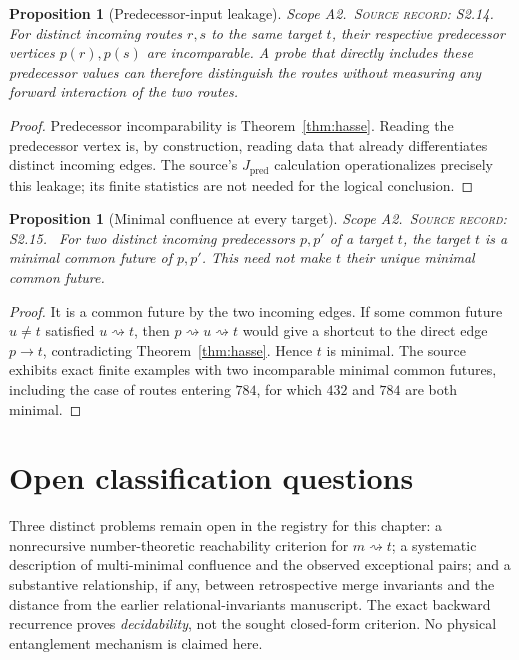 \documentclass[11pt,oneside,openany]{book}
\newtheorem{proposition}[theorem]{Proposition}
\theoremstyle{definition}
\theoremstyle{remark}
\newcommand{\scope}[1]{\textsf{\small Scope #1.}\ }
\newcommand{\record}[1]{\textup{\textsc{Source record: #1.}}\ }
\begin{document}
\begin{proposition}[Predecessor-input leakage]\label{prop:leak}
\scope{A2}\record{S2.14} For distinct incoming routes \(r,s\) to the same target \(t\), their respective predecessor vertices \(p(r),p(s)\) are incomparable. A probe that directly includes these predecessor values can therefore distinguish the routes without measuring any forward interaction of the two routes.
\end{proposition}
\begin{proof}
Predecessor incomparability is Theorem~\ref{thm:hasse}. Reading the predecessor vertex is, by construction, reading data that already differentiates distinct incoming edges. The source's \(J_{\mathrm{pred}}\) calculation operationalizes precisely this leakage; its finite statistics are not needed for the logical conclusion.
\end{proof}

\begin{proposition}[Minimal confluence at every target]\label{prop:confluence}
\scope{A2}\record{S2.15} For two distinct incoming predecessors \(p,p'\) of a target \(t\), the target \(t\) is a minimal common future of \(p,p'\). This need not make \(t\) their unique minimal common future.
\end{proposition}
\begin{proof}
It is a common future by the two incoming edges. If some common future \(u\ne t\) satisfied \(u\rightsquigarrow t\), then \(p\rightsquigarrow u\rightsquigarrow t\) would give a shortcut to the direct edge \(p\to t\), contradicting Theorem~\ref{thm:hasse}. Hence \(t\) is minimal. The source exhibits exact finite examples with two incomparable minimal common futures, including the case of routes entering \(784\), for which \(432\) and \(784\) are both minimal.
\end{proof}

\section{Open classification questions}
Three distinct problems remain open in the registry for this chapter: a nonrecursive number-theoretic reachability criterion for \(m\rightsquigarrow t\); a systematic description of multi-minimal confluence and the observed exceptional pairs; and a substantive relationship, if any, between retrospective merge invariants and the distance from the earlier relational-invariants manuscript. The exact backward recurrence proves \emph{decidability}, not the sought closed-form criterion. No physical entanglement mechanism is claimed here.
\end{document}
